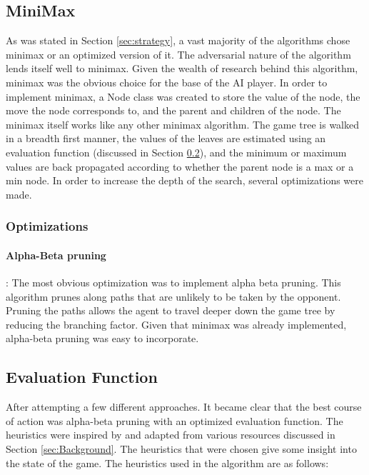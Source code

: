 \documentclass[]{article}
\begin{document}
\subsection{MiniMax}
As was stated in Section \ref{sec:strategy}, a vast majority of the algorithms chose minimax or an optimized version of it. The adversarial nature of the algorithm lends itself well to minimax. Given the wealth of research behind this algorithm, minimax was the obvious choice for the base of the AI player. In order to implement minimax, a Node class was created to store the value of the node, the move the node corresponds to, and the parent and children of the node. %
The minimax itself works like any other minimax algorithm. The game tree is walked in a breadth first manner, the values of the leaves are estimated using an evaluation function (discussed in Section \ref{sec:evalFn}), and the minimum or maximum values are back propagated according to whether the parent node is a max or a min node. In order to increase the depth of the search, several optimizations were made.

\subsubsection{Optimizations}
\paragraph{Alpha-Beta pruning}: The most obvious optimization was to implement alpha beta pruning. This algorithm prunes along paths that are unlikely to be taken by the opponent. Pruning the paths allows the agent to travel deeper down the game tree by reducing the branching factor. Given that minimax was already implemented, alpha-beta pruning was easy to incorporate. 


\subsection{Evaluation Function}
\label{sec:evalFn}
After attempting a few different approaches. It became clear that the best course of action was alpha-beta pruning with an optimized evaluation function. The heuristics were inspired by and adapted from various resources discussed in Section \ref{sec:Background}. The heuristics that were chosen give some insight into the state of the game. The heuristics used in the algorithm are as follows:
\end{document}
